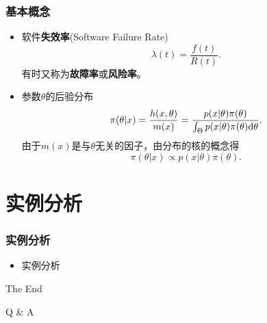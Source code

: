 \documentclass{beamer}
\begin{document}
\begin{frame}
\frametitle{基本概念}
\begin{itemize}
\item 软件{\bf 失效率}(Software Failure Rate)
\begin{equation}
\lambda(t)=\frac{f(t)}{R(t)}. \label{lambda}
\end{equation}
有时又称为{\bf 故障率}或{\bf 风险率}。
\end{itemize}
\begin{itemize}
\item 参数$\theta$的后验分布
\begin{equation}
\pi(\theta |x)=\frac{h(x,\theta)}{m(x)}=\frac{p(x|\theta)\pi(\theta)}{\int_\Theta p(x|\theta)\pi(\theta){\rm d}\theta}. \label{BayesF}
\end{equation}
由于$m(x)$是与$\theta$无关的因子，由分布的核的概念得
\begin{equation}
\pi(\theta |x)\propto p(x|\theta)\pi(\theta). \label{PiCore}
\end{equation}
\end{itemize}
\end{frame}

\section{实例分析}

\begin{frame}
\frametitle{实例分析}
\begin{itemize}
\item 实例分析
\end{itemize}
\end{frame}

\begin{frame}
\Huge{\centerline{The End}\centerline{Q \& A}}
\end{frame}
\end{document}
